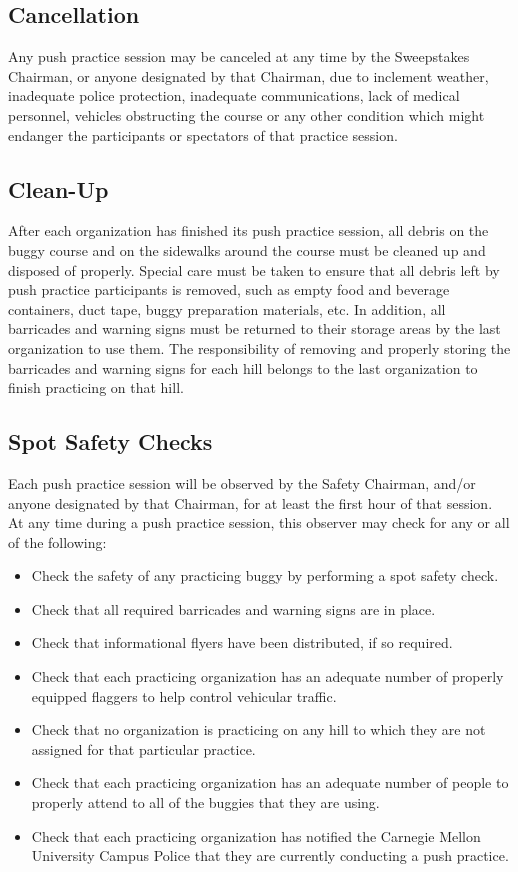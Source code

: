 \subsection{Cancellation}

Any push practice session may be canceled at any time by the Sweepstakes Chairman, or anyone designated by that Chairman, due to inclement weather, inadequate police protection, inadequate communications, lack of medical personnel, vehicles obstructing the course or any other condition which might endanger the participants or spectators of that practice session.

\subsection{Clean-Up}

After each organization has finished its push practice session, all debris on the buggy course and on the sidewalks around the course must be cleaned up and disposed of properly. Special care must be taken to ensure that all debris left by push practice participants is removed, such as empty food and beverage containers, duct tape, buggy preparation materials, etc. In addition, all barricades and warning signs must be returned to their storage areas by the last organization to use them. The responsibility of removing and properly storing the barricades and warning signs for each hill belongs to the last organization to finish practicing on that hill.

\subsection{Spot Safety Checks}

Each push practice session will be observed by the Safety Chairman, and/or anyone designated by that Chairman, for at least the first hour of that session. At any time during a push practice session, this observer may check for any or all of the following:
\begin{itemize}
	\item Check the safety of any practicing buggy by performing a spot safety check.
	\item Check that all required barricades and warning signs are in place.
	\item Check that informational flyers have been distributed, if so required.
	\item Check that each practicing organization has an adequate number of properly equipped flaggers to help control vehicular traffic.
	\item Check that no organization is practicing on any hill to which they are not assigned for that particular practice.
	\item Check that each practicing organization has an adequate number of people to properly attend to all of the buggies that they are using.
	\item Check that each practicing organization has notified the Carnegie Mellon University Campus Police that they are currently conducting a push practice.
\end{itemize}


